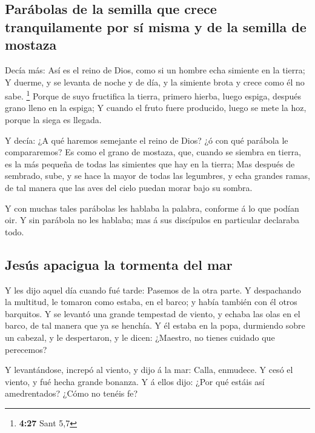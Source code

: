 \hypertarget{paruxe1bolas-de-la-semilla-que-crece-tranquilamente-por-suxed-misma-y-de-la-semilla-de-mostaza}{%
\subsection{Parábolas de la semilla que crece tranquilamente por sí
misma y de la semilla de
mostaza}\label{paruxe1bolas-de-la-semilla-que-crece-tranquilamente-por-suxed-misma-y-de-la-semilla-de-mostaza}}

 Decía más: Así es el reino de Dios, como si un hombre echa
simiente en la tierra;  Y duerme, y se levanta de noche y
de día, y la simiente brota y crece como él no sabe. \footnote{\textbf{4:27}
  Sant 5,7}  Porque de suyo fructifica la tierra, primero
hierba, luego espiga, después grano lleno en la espiga;  Y
cuando el fruto fuere producido, luego se mete la hoz, porque la siega
es llegada.

 Y decía: ¿A qué haremos semejante el reino de Dios? ¿ó con
qué parábola le compararemos?  Es como el grano de mostaza,
que, cuando se siembra en tierra, es la más pequeña de todas las
simientes que hay en la tierra;  Mas después de sembrado,
sube, y se hace la mayor de todas las legumbres, y echa grandes ramas,
de tal manera que las aves del cielo puedan morar bajo su sombra.

 Y con muchas tales parábolas les hablaba la palabra,
conforme á lo que podían oir.  Y sin parábola no les
hablaba; mas á sus discípulos en particular declaraba todo.

\hypertarget{jesuxfas-apacigua-la-tormenta-del-mar}{%
\subsection{Jesús apacigua la tormenta del
mar}\label{jesuxfas-apacigua-la-tormenta-del-mar}}

 Y les dijo aquel día cuando fué tarde: Pasemos de la otra
parte.  Y despachando la multitud, le tomaron como estaba,
en el barco; y había también con él otros barquitos.  Y se
levantó una grande tempestad de viento, y echaba las olas en el barco,
de tal manera que ya se henchía.  Y él estaba en la popa,
durmiendo sobre un cabezal, y le despertaron, y le dicen: ¿Maestro, no
tienes cuidado que perecemos?

 Y levantándose, increpó al viento, y dijo á la mar: Calla,
enmudece. Y cesó el viento, y fué hecha grande bonanza.  Y
á ellos dijo: ¿Por qué estáis así amedrentados? ¿Cómo no tenéis fe?

